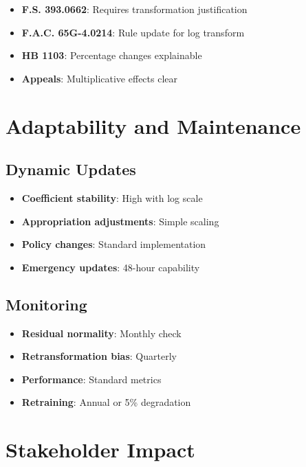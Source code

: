 \begin{itemize}
    \item[\yellowwarning] \textbf{F.S. 393.0662}:  Requires transformation justification
    \item[\yellowwarning] \textbf{F.A.C. 65G-4.0214}: Rule update for log transform
    \item[\greencheck] \textbf{HB 1103}: Percentage changes explainable
    \item[\greencheck] \textbf{Appeals}: Multiplicative effects clear
\end{itemize}

\section{Adaptability and Maintenance}

\subsection{Dynamic Updates}

\begin{itemize}
    \item \textbf{Coefficient stability}: High with log scale
    \item \textbf{Appropriation adjustments}: Simple scaling
    \item \textbf{Policy changes}: Standard implementation
    \item \textbf{Emergency updates}: 48-hour capability
\end{itemize}

\subsection{Monitoring}

\begin{itemize}
    \item \textbf{Residual normality}: Monthly check
    \item \textbf{Retransformation bias}: Quarterly
    \item \textbf{Performance}: Standard metrics
    \item \textbf{Retraining}: Annual or 5\% degradation
\end{itemize}

\section{Stakeholder Impact}

